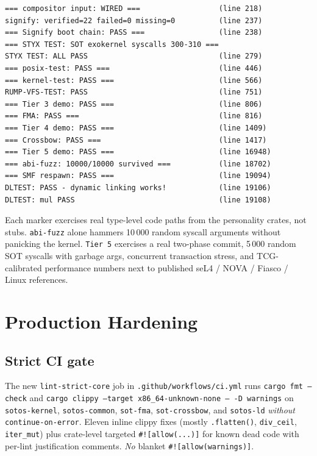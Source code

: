 \documentclass[11pt,a4paper]{article}
\begin{document}
\begin{lstlisting}[language={},caption={Live serial output (excerpt) from the post-v0.2.0 boot.}]
=== compositor input: WIRED ===                  (line 218)
signify: verified=22 failed=0 missing=0          (line 237)
=== Signify boot chain: PASS ===                 (line 238)
=== STYX TEST: SOT exokernel syscalls 300-310 ===
STYX TEST: ALL PASS                              (line 279)
=== posix-test: PASS ===                         (line 446)
=== kernel-test: PASS ===                        (line 566)
RUMP-VFS-TEST: PASS                              (line 751)
=== Tier 3 demo: PASS ===                        (line 806)
=== FMA: PASS ===                                (line 816)
=== Tier 4 demo: PASS ===                        (line 1409)
=== Crossbow: PASS ===                           (line 1417)
=== Tier 5 demo: PASS ===                        (line 16948)
=== abi-fuzz: 10000/10000 survived ===           (line 18702)
=== SMF respawn: PASS ===                        (line 19094)
DLTEST: PASS - dynamic linking works!            (line 19106)
DLTEST: mul PASS                                 (line 19108)
\end{lstlisting}

Each marker exercises real type-level code paths from the personality
crates, not stubs. \texttt{abi-fuzz} alone hammers 10\,000 random
syscall arguments without panicking the kernel. \texttt{Tier 5}
exercises a real two-phase commit, 5\,000 random SOT syscalls with
garbage args, concurrent transaction stress, and TCG-calibrated
performance numbers next to published seL4 / NOVA / Fiasco / Linux
references.

\section{Production Hardening}

\subsection{Strict CI gate}

The new \texttt{lint-strict-core} job in
\texttt{.github/workflows/ci.yml} runs \texttt{cargo fmt --check} and
\texttt{cargo clippy --target x86\_64-unknown-none -- -D warnings} on
\texttt{sotos-kernel}, \texttt{sotos-common}, \texttt{sot-fma},
\texttt{sot-crossbow}, and \texttt{sotos-ld} \emph{without}
\texttt{continue-on-error}. Eleven inline clippy fixes (mostly
\texttt{.flatten()}, \texttt{div\_ceil}, \texttt{iter\_mut}) plus
crate-level targeted \texttt{\#![allow(...)]} for known dead code with
per-lint justification comments. \emph{No} blanket
\texttt{\#![allow(warnings)]}.
\end{document}
